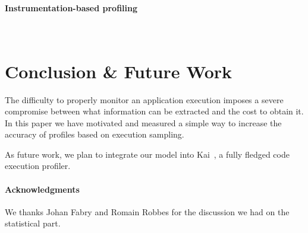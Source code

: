 \documentclass{sig-alternate}
\newcommand{\seclabel}[1]{\label{sec:#1}}
\begin{document}
\paragraph{Instrumentation-based profiling}

~\cite{Arno01a}

\section{Conclusion \& Future Work}\seclabel{conclusion}

The difficulty to properly monitor an application execution imposes a severe compromise between what information can be extracted and the cost to obtain it. In this paper we have motivated and measured a simple way to increase the accuracy of profiles based on execution sampling.

As future work, we plan to integrate our model into Kai~\cite{Berg11f}, a fully fledged code execution profiler.


\paragraph{Acknowledgments} We thanks Johan Fabry and Romain Robbes for the discussion we had on the statistical part.





%
\end{document}

